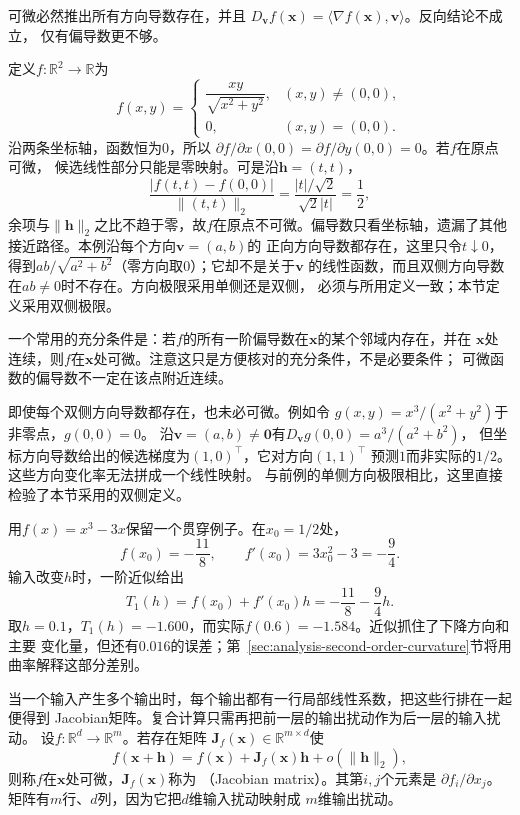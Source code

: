 可微必然推出所有方向导数存在，并且 $D_{\bm{v}}f(\bm{x})=\langle\nabla f(\bm{x}),\bm{v}\rangle$。反向结论不成立， 仅有偏导数更不够。
\begin{example}[偏导数存在但不可微]
\label{ex:analysis-partials-not-differentiable}
定义$f:\mathbb{R}^2\to\mathbb{R}$为
\[   f(x,y)=
\begin{cases}     \dfrac{xy}{\sqrt{x^2+y^2}}, & (x,y)\neq(0,0),\\[6pt]     0, & (x,y)=(0,0).
\end{cases} \]
沿两条坐标轴，函数恒为$0$，所以 $\partial f/\partial x(0,0)=\partial f/\partial y(0,0)=0$。若$f$在原点可微， 候选线性部分只能是零映射。可是沿$\bm{h}=(t,t)$，
\[   \frac{|f(t,t)-f(0,0)|}{\lVert(t,t)\rVert_2}   =   \frac{|t|/\sqrt{2}}{\sqrt{2}|t|}   =\frac12, \]
余项与$\lVert\bm{h}\rVert_2$之比不趋于零，故$f$在原点不可微。偏导数只看坐标轴，遗漏了其他接近路径。本例沿每个方向$\bm v=(a,b)$的
正向方向导数都存在，这里只令$t\downarrow0$，得到$ab/\sqrt{a^2+b^2}$（零方向取$0$）；它却不是关于$\bm v$
的线性函数，而且双侧方向导数在$ab\neq0$时不存在。方向极限采用单侧还是双侧，
必须与所用定义一致；本节定义采用双侧极限。
\end{example}

一个常用的充分条件是：若$f$的所有一阶偏导数在$\bm{x}$的某个邻域内存在，并在 $\bm{x}$处连续，则$f$在$\bm{x}$处可微。注意这只是方便核对的充分条件，不是必要条件； 可微函数的偏导数不一定在该点附近连续。

即使每个双侧方向导数都存在，也未必可微。例如令
$g(x,y)=x^3/(x^2+y^2)$于非零点，$g(0,0)=0$。
沿$\bm v=(a,b)\neq\bm0$有$D_{\bm v}g(0,0)=a^3/(a^2+b^2)$，
但坐标方向导数给出的候选梯度为$(1,0)^\top$，它对方向$(1,1)^\top$
预测$1$而非实际的$1/2$。这些方向变化率无法拼成一个线性映射。
与前例的单侧方向极限相比，这里直接检验了本节采用的双侧定义。

用$f(x)=x^3-3x$保留一个贯穿例子。在$x_0=1/2$处，
\[
  f(x_0)=-\frac{11}{8},\qquad f'(x_0)=3x_0^2-3=-\frac94.
\]
输入改变$h$时，一阶近似给出
\begin{equation}
  T_1(h)=f(x_0)+f'(x_0)h=-\frac{11}{8}-\frac94h.
\label{eq:analysis-cubic-linear-model}
\end{equation}
取$h=0.1$，$T_1(h)=-1.600$，而实际$f(0.6)=-1.584$。近似抓住了下降方向和主要
变化量，但还有$0.016$的误差；第~\ref{sec:analysis-second-order-curvature}节将用曲率解释这部分差别。

当一个输入产生多个输出时，每个输出都有一行局部线性系数，把这些行排在一起便得到
Jacobian矩阵。复合计算只需再把前一层的输出扰动作为后一层的输入扰动。
设$f:\mathbb{R}^d\to\mathbb{R}^m$。若存在矩阵 $\bm{J}_f(\bm{x})\in\mathbb{R}^{m\times d}$使
\begin{equation}
  f(\bm{x}+\bm{h})
  =
  f(\bm{x})+\bm{J}_f(\bm{x})\bm{h}
  +o(\lVert\bm{h}\rVert_2),
\label{eq:analysis-jacobian-linearization}
\end{equation}
则称$f$在$\bm{x}$处可微，$\bm{J}_f(\bm{x})$称为
（Jacobian matrix）。其第$i,j$个元素是 $\partial f_i/\partial x_j$。矩阵有$m$行、$d$列，因为它把$d$维输入扰动映射成 $m$维输出扰动。

